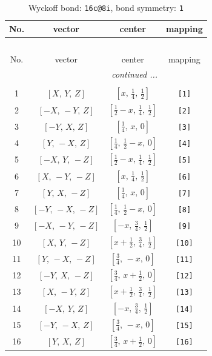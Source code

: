\documentclass[fleqn,8pt]{jsarticle}
\begin{document}
\begin{longtable}{cccc}
\caption{Wyckoff bond: {\tt 16c@8i}, bond symmetry: {\tt 1}}
 \\
 \hline \hline
No. & vector & center & mapping \\ \hline \endfirsthead

\multicolumn{3}{l}{\tablename\ \thetable{}} \\
 \hline \hline
No. & vector & center & mapping \\ \hline \endhead

 \hline \hline
\multicolumn{3}{r}{\footnotesize\it continued ...} \\ \endfoot

 \hline \hline
\multicolumn{3}{r}{} \\ \endlastfoot

1 & $\left[ X,\, Y,\, Z \right]$ & $\left[ x,\, \frac{1}{4},\, \frac{1}{2} \right]$ & {\tt [1]} \\ \hline
2 & $\left[ - X,\, - Y,\, Z \right]$ & $\left[ \frac{1}{2} - x,\, \frac{1}{4},\, \frac{1}{2} \right]$ & {\tt [2]} \\ \hline
3 & $\left[ - Y,\, X,\, Z \right]$ & $\left[ \frac{1}{4},\, x,\, 0 \right]$ & {\tt [3]} \\ \hline
4 & $\left[ Y,\, - X,\, Z \right]$ & $\left[ \frac{1}{4},\, \frac{1}{2} - x,\, 0 \right]$ & {\tt [4]} \\ \hline
5 & $\left[ - X,\, Y,\, - Z \right]$ & $\left[ \frac{1}{2} - x,\, \frac{1}{4},\, \frac{1}{2} \right]$ & {\tt [5]} \\ \hline
6 & $\left[ X,\, - Y,\, - Z \right]$ & $\left[ x,\, \frac{1}{4},\, \frac{1}{2} \right]$ & {\tt [6]} \\ \hline
7 & $\left[ Y,\, X,\, - Z \right]$ & $\left[ \frac{1}{4},\, x,\, 0 \right]$ & {\tt [7]} \\ \hline
8 & $\left[ - Y,\, - X,\, - Z \right]$ & $\left[ \frac{1}{4},\, \frac{1}{2} - x,\, 0 \right]$ & {\tt [8]} \\ \hline
9 & $\left[ - X,\, - Y,\, - Z \right]$ & $\left[ - x,\, \frac{3}{4},\, \frac{1}{2} \right]$ & {\tt [9]} \\ \hline
10 & $\left[ X,\, Y,\, - Z \right]$ & $\left[ x + \frac{1}{2},\, \frac{3}{4},\, \frac{1}{2} \right]$ & {\tt [10]} \\ \hline
11 & $\left[ Y,\, - X,\, - Z \right]$ & $\left[ \frac{3}{4},\, - x,\, 0 \right]$ & {\tt [11]} \\ \hline
12 & $\left[ - Y,\, X,\, - Z \right]$ & $\left[ \frac{3}{4},\, x + \frac{1}{2},\, 0 \right]$ & {\tt [12]} \\ \hline
13 & $\left[ X,\, - Y,\, Z \right]$ & $\left[ x + \frac{1}{2},\, \frac{3}{4},\, \frac{1}{2} \right]$ & {\tt [13]} \\ \hline
14 & $\left[ - X,\, Y,\, Z \right]$ & $\left[ - x,\, \frac{3}{4},\, \frac{1}{2} \right]$ & {\tt [14]} \\ \hline
15 & $\left[ - Y,\, - X,\, Z \right]$ & $\left[ \frac{3}{4},\, - x,\, 0 \right]$ & {\tt [15]} \\ \hline
16 & $\left[ Y,\, X,\, Z \right]$ & $\left[ \frac{3}{4},\, x + \frac{1}{2},\, 0 \right]$ & {\tt [16]} \\
\end{longtable}
\end{document}
